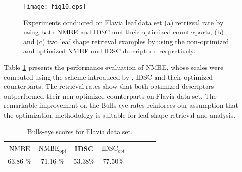 {\begin{figure}[]
\texttt{[image: fig10.eps]}
\caption{ Experiments conducted on Flavia leaf data set (a) retrieval rate by using both NMBE and IDSC and their optimized counterparts, (b) and (c) two leaf shape retrieval examples by using the non-optimized and optimized NMBE and IDSC descriptors, respectively.\label{fig1Ooptimization_graph}}
\end{figure}

 Table \ref{table_bull_eyes_leaves} presents the performance evaluation of NMBE, whose scales were computed using the scheme introduced by , IDSC and their optimized counterparts.  The retrieval rates show that both optimized descriptors outperformed their non-optimized counterparts on Flavia data set. The remarkable improvement on the Bulls-eye rates reinforces our assumption that the optimization methodology is suitable for leaf shape retrieval and analysis.

\begin{table}[h!]
\centering
\caption{Bulls-eye scores for Flavia data set.}
\label{table_bull_eyes_leaves}
  \begin{tabular}{cccccccc}
  \toprule[1.5pt]
 $\operatorname{NMBE}$ & $\operatorname{NMBE_{opt}}$ & IDSC    & $\operatorname{IDSC_{opt}}$\\ \midrule
     63.86 \%  & 71.16 \%  & 53.38\%    & 77.50\%       \\
  \bottomrule[1.5pt]
  \end{tabular}
\end{table}

}
